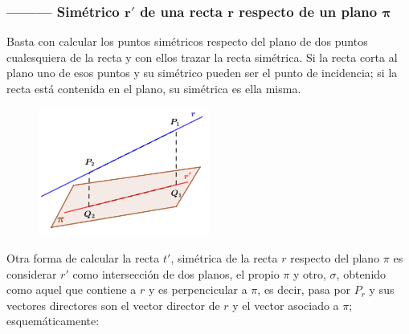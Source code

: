 \subsubsection{--------- Simétrico $\boldsymbol{r}'$ de una recta $\boldsymbol{r}$ respecto de un plano $\boldsymbol{\pi}$}

\begin{multicols}{2}

Basta con calcular los puntos simétricos respecto del plano de dos puntos cualesquiera de la recta y con ellos trazar la recta simétrica. Si la recta corta al plano uno de esos puntos y su simétrico pueden ser el punto de incidencia; si la recta está contenida en el plano, su simétrica es ella misma.
\begin{figure}[H]
		\centering
		\includegraphics[width=0.5\textwidth]{imagenes/imagenes11/T11IM12.png}
	\end{figure}
\end{multicols}

Otra forma de calcular la recta $t'$, simétrica de la recta $r$ respecto del plano $\pi$ es considerar $r'$ como intersección de dos planos, el propio $\pi$ y otro, $\sigma$, obtenido como aquel que contiene a $r$ y es perpencicular a $\pi$, es decir, pasa por $P_r$ y sus vectores directores son el vector director de $r$ y el vector asociado a $\pi$; esquemáticamente:

